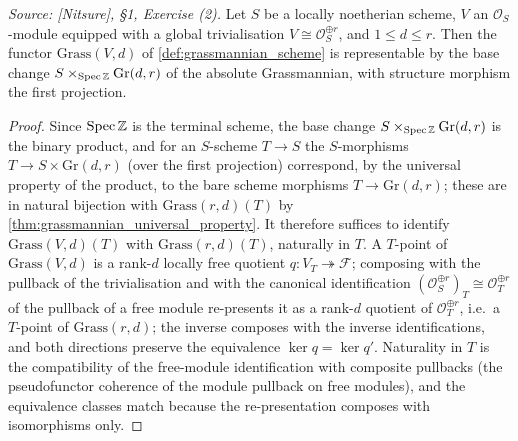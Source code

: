\begin{lemma}\leanok
  \label{lem:grassmannian_representable_free}
  \textit{Source: [Nitsure], \S 1, Exercise (2).}
  Let \(S\) be a locally noetherian scheme, \(V\) an \(\mathcal{O}_S\)-module
  equipped with a global trivialisation \(V \cong \mathcal{O}_S^{\oplus r}\),
  and \(1 \le d \le r\). Then the functor \(\mathrm{Grass}(V, d)\) of
  \cref{def:grassmannian_scheme} is representable by the base change
  \(S \times_{\operatorname{Spec} \mathbb{Z}} \mathrm{Gr}(d,r)\) of the absolute
  Grassmannian, with structure morphism the first projection.
\end{lemma}

\begin{proof}\leanok
  Since \(\operatorname{Spec} \mathbb{Z}\) is the terminal scheme, the base change
  \(S \times_{\operatorname{Spec}\mathbb{Z}} \mathrm{Gr}(d,r)\) is the binary product, and
  for an \(S\)-scheme \(T \to S\) the \(S\)-morphisms
  \(T \to S \times \mathrm{Gr}(d,r)\) (over the first projection) correspond,
  by the universal property of the product, to the bare scheme morphisms
  \(T \to \mathrm{Gr}(d,r)\); these are in natural bijection with
  \(\mathrm{Grass}(r,d)(T)\) by \cref{thm:grassmannian_universal_property}.
  It therefore suffices to identify \(\mathrm{Grass}(V,d)(T)\) with
  \(\mathrm{Grass}(r,d)(T)\), naturally in \(T\).  A \(T\)-point of
  \(\mathrm{Grass}(V,d)\) is a rank-\(d\) locally free quotient
  \(q : V_T \twoheadrightarrow \mathcal{F}\); composing with the pullback of
  the trivialisation and with the canonical identification
  \((\mathcal{O}_S^{\oplus r})_T \cong \mathcal{O}_T^{\oplus r}\) of the
  pullback of a free module re-presents it as a rank-\(d\) quotient of
  \(\mathcal{O}_T^{\oplus r}\), i.e.\ a \(T\)-point of
  \(\mathrm{Grass}(r,d)\); the inverse composes with the inverse
  identifications, and both directions preserve the equivalence
  \(\ker q = \ker q'\).  Naturality in \(T\) is the compatibility of the
  free-module identification with composite pullbacks (the pseudofunctor
  coherence of the module pullback on free modules), and the equivalence
  classes match because the re-presentation composes with isomorphisms only.
\end{proof}

